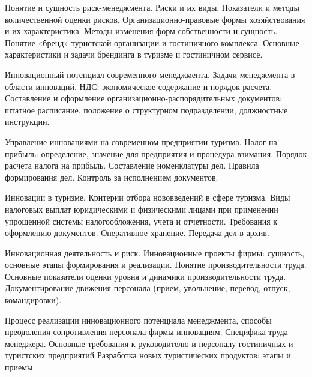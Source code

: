 \documentclass[
	11pt,
	a4paper,
	]
	{article}
\begin{document}
\bigskip

\noindent{} 
	{
		Понятие и сущность риск-менеджмента. Риски и их виды. Показатели и методы количественной оценки рисков.
	}{
		Организационно-правовые формы хозяйствования и их характеристика. Методы изменения форм собственности и сущность.
	}{
		Понятие «бренд» туристской организации и гостиничного комплекса. Основные характеристики и задачи брендинга в туризме и гостиничном сервисе.
	}

\bigskip

\noindent{} 
	{
		Инновационный потенциал современного менеджмента. Задачи менеджмента в области инноваций.
	}{
		НДС: экономическое содержание и порядок расчета.
	}{
		Составление и оформление организационно-распорядительных документов: штатное расписание, положение о структурном подразделении, должностные инструкции.
	}

\bigskip

\noindent{} 
	{
		Управление инновациями на современном предприятии туризма.
	}{
		Налог на прибыль: определение, значение для предприятия и процедура взимания. Порядок расчета налога на прибыль.
	}{
		Составление номенклатуры дел. Правила формирования дел. Контроль за исполнением документов.
	}

\bigskip

\noindent{} 
	{
		Инновации в туризме. Критерии отбора нововведений в сфере туризма.
	}{
		Виды налоговых выплат юридическими и физическими лицами при применении упрощенной системы налогообложения, учета и отчетности.
	}{
		Требования к оформлению документов. Оперативное хранение. Передача дел в архив.
	}

\bigskip

\noindent{} 
	{
		Инновационная деятельность и риск. Инновационные проекты фирмы: сущность, основные этапы формирования и реализации.
	}{
		Понятие производительности труда. Основные показатели оценки уровня и динамики производительности труда.
	}{
		Документирование движения персонала (прием, увольнение, перевод, отпуск, командировки).
	}

\bigskip

\noindent{} 
	{
		Процесс реализации инновационного потенциала менеджмента, способы преодоления сопротивления персонала фирмы инновациям.
	}{
		Специфика труда менеджера. Основные требования к руководителю и персоналу гостиничных и туристских предприятий
	}{
		Разработка новых туристических продуктов: этапы и приемы.
	}

\bigskip
\end{document}
